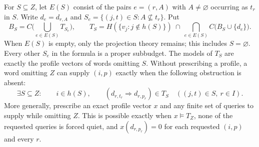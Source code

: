 \begin{theorem}
\label{core:thm:joined-profile-theory}
For $S\subseteq Z$, let $E(S)$ consist of the pairs $e=(r,A)$ with
$A\ne\varnothing$ occurring as $t_r$ in $S$. Write $d_e=d_{r,A}$
and $S_e=\{(j,t)\in S:A\not\subseteq t_r\}$. Put
\[
 B_S=C\biggl(\bigcup_{e\in E(S)}T_{S_e}\biggr),\qquad
 T_S=H(\{v_j:j\notin h(S)\})\ \cap\
 \bigcap_{e\in E(S)} C\bigl(B_S\cup\{d_e\}\bigr).
\]
When $E(S)$ is empty, only the projection theory remains; this includes
$S=\varnothing$. Every other $S_e$ in the formula is a proper subbudget.
The models of $T_S$ are exactly the profile vectors of words omitting
$S$. Without prescribing a profile, a word omitting $Z$ can supply
$(i,p)$ exactly when the following obstruction is absent:
\begin{equation}\label{core:eq:joined-profile-quiet}
 \exists S\subseteq Z:\qquad i\in h(S),\qquad
 (d_{r,t_r}\Rightarrow d_{r,p_r})\in T_S
       \quad((j,t)\in S,\ r\in I).
\end{equation}
More generally, prescribe an exact profile vector $x$ and any finite
set of queries to supply while omitting $Z$. This is possible exactly
when $x\models T_Z$, none of the requested queries is forced quiet,
and $x(d_{r,p_r})=0$ for each requested $(i,p)$ and every $r$.
\end{theorem}
